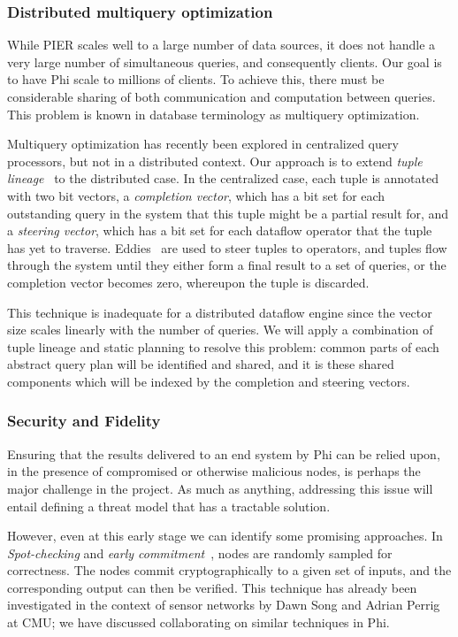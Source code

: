 \documentclass[twocolumn,10pt]{article}
\def\Lrp{Phi\xspace}
\begin{document}
\subsubsection*{Distributed multiquery optimization}

While PIER scales well to a large number of data sources, it does not
handle a very large number of simultaneous queries, and consequently
clients.  Our goal is to have \Lrp scale to millions of clients.  To
achieve this, there must be considerable sharing of both communication
and computation between queries.  This problem is known in database
terminology as multiquery optimization. 

Multiquery optimization has recently been explored in centralized
query processors, but not in a distributed context.  Our approach is
to extend \emph{tuple lineage}~\cite{madden_cacq} to the distributed case.  
In the centralized case, each tuple is annotated with two bit vectors,
a \emph{completion vector}, which has a bit set for each outstanding
query in the system that this tuple might be a partial result for, and
a \emph{steering vector}, which has a bit set for each dataflow
operator that the tuple has yet to traverse.  Eddies~\cite{avnur00eddies} are
used to steer tuples to operators, and tuples flow through the system
until they either form a final result to a set of queries, or the
completion vector becomes zero, whereupon the tuple is discarded. 

This technique is inadequate for a distributed dataflow engine since
the vector size scales linearly with the number of queries.  We will
apply a combination of tuple lineage and static planning to resolve
this problem: common parts of each abstract query plan will be
identified and shared, and it is these shared components which will be
indexed by the completion and steering vectors. 

\subsubsection*{Security and Fidelity}

Ensuring that the results delivered to an end system by \Lrp can be
relied upon, in the presence of compromised or otherwise malicious
nodes, is perhaps the major challenge in the project.  As much as
anything, addressing this issue will entail defining a threat model
that has a tractable solution. 

However, even at this early stage we can identify some promising
approaches.  In \emph{Spot-checking} and \emph{early
commitment}~\cite{Ergun1998}, nodes are randomly sampled for
correctness.  The nodes commit cryptographically to a given set of
inputs, and the corresponding output can then be verified.  This
technique has already been investigated in the context of sensor
networks by Dawn Song and Adrian Perrig at CMU; we have discussed
collaborating on similar techniques in \Lrp.
\end{document}
